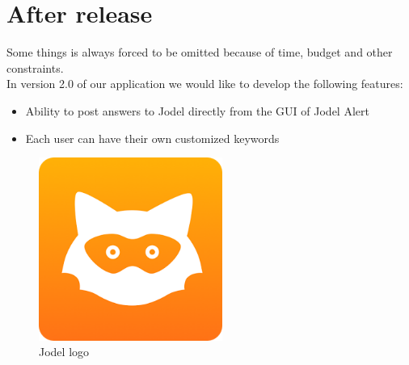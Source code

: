 \documentclass[a4paper,12pt]{article}
\begin{document}
\section{After release}
Some things is always forced to be omitted because of time, budget and other constraints.\\

In version 2.0 of our application we would like to develop the following features:
\begin{itemize}
	\item Ability to post answers to Jodel directly from the GUI of Jodel Alert
	\item Each user can have their own customized keywords
\end{itemize}
\begin{figure}[!h]
	\centering
	\includegraphics[height=6cm]{img/jodel.png}
	\caption{Jodel logo}
	\label{Jodel}
\end{figure}
\end{document}
